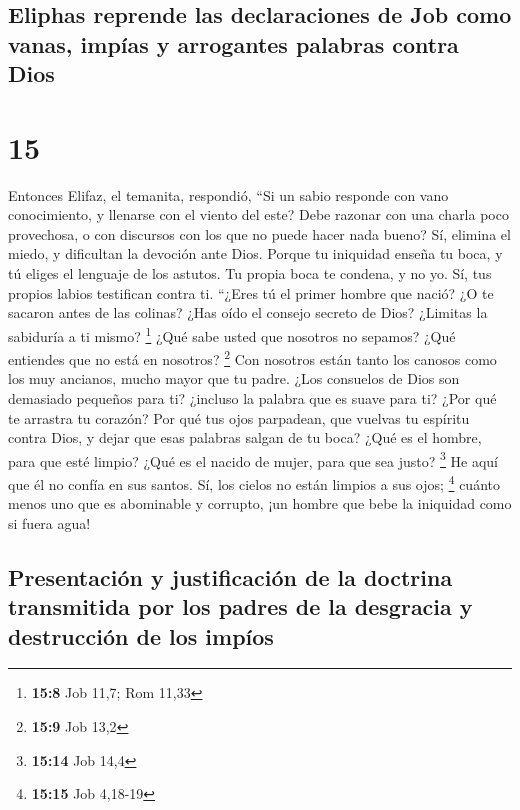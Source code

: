 \hypertarget{eliphas-reprende-las-declaraciones-de-job-como-vanas-impuxedas-y-arrogantes-palabras-contra-dios}{%
\subsection{Eliphas reprende las declaraciones de Job como vanas, impías
y arrogantes palabras contra
Dios}\label{eliphas-reprende-las-declaraciones-de-job-como-vanas-impuxedas-y-arrogantes-palabras-contra-dios}}

\hypertarget{section-14}{%
\section{15}\label{section-14}}

 Entonces Elifaz, el temanita, respondió, 
``Si un sabio responde con vano conocimiento, y llenarse con el viento
del este?  Debe razonar con una charla poco provechosa, o
con discursos con los que no puede hacer nada bueno?  Sí,
elimina el miedo, y dificultan la devoción ante Dios. 
Porque tu iniquidad enseña tu boca, y tú eliges el lenguaje de los
astutos.  Tu propia boca te condena, y no yo. Sí, tus
propios labios testifican contra ti.  ``¿Eres tú el primer
hombre que nació? ¿O te sacaron antes de las colinas? 
¿Has oído el consejo secreto de Dios? ¿Limitas la sabiduría a ti mismo?
\footnote{\textbf{15:8} Job 11,7; Rom 11,33}  ¿Qué sabe
usted que nosotros no sepamos? ¿Qué entiendes que no está en nosotros?
\footnote{\textbf{15:9} Job 13,2}  Con nosotros están
tanto los canosos como los muy ancianos, mucho mayor que tu padre.
 ¿Los consuelos de Dios son demasiado pequeños para ti?
¿incluso la palabra que es suave para ti?  ¿Por qué te
arrastra tu corazón? Por qué tus ojos parpadean,  que
vuelvas tu espíritu contra Dios, y dejar que esas palabras salgan de tu
boca?  ¿Qué es el hombre, para que esté limpio? ¿Qué es
el nacido de mujer, para que sea justo? \footnote{\textbf{15:14} Job
  14,4}  He aquí que él no confía en sus santos. Sí, los
cielos no están limpios a sus ojos; \footnote{\textbf{15:15} Job 4,18-19}
 cuánto menos uno que es abominable y corrupto, ¡un
hombre que bebe la iniquidad como si fuera agua!

\hypertarget{presentaciuxf3n-y-justificaciuxf3n-de-la-doctrina-transmitida-por-los-padres-de-la-desgracia-y-destrucciuxf3n-de-los-impuxedos}{%
\subsection{Presentación y justificación de la doctrina transmitida por
los padres de la desgracia y destrucción de los
impíos}\label{presentaciuxf3n-y-justificaciuxf3n-de-la-doctrina-transmitida-por-los-padres-de-la-desgracia-y-destrucciuxf3n-de-los-impuxedos}}

